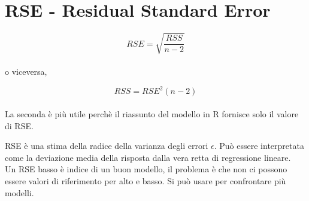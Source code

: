 \section{RSE - Residual Standard Error}
\[ RSE = \sqrt{\frac{RSS}{n - 2}} \]\\

o viceversa,

\[ RSS = RSE^2 (n-2) \]\\

La seconda è più utile perchè il riassunto del modello in R fornisce solo
il valore di RSE.

RSE è una stima della radice della varianza degli errori $\epsilon$. Pu\`o essere 
interpretata come la deviazione media della risposta dalla vera retta di 
regressione lineare.\\
Un RSE basso \`e indice di un buon modello, il problema \`e che non ci possono 
essere valori di riferimento per alto e basso.
Si può usare per confrontare più modelli.
